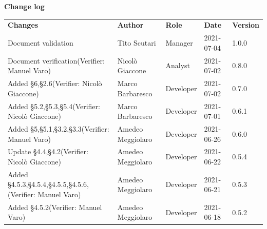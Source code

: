\documentclass[a4paper]{article}
\begin{document}
\begin{center}
    \textbf{\Large Change log}\\
    \vspace{10px}
    \begin{table}[h!]
        \centering
        \renewcommand{\arraystretch}{1.8}
        \begin{tabular}{p{150px} p{90px} p{80px} p{60px} p{45px}}
            \rowcolor{logo!70} \textbf{Changes}                                                    & \textbf{Author}   & \textbf{Role} & \textbf{Date} & \textbf{Version} \\
            Document validation                                                                    & Tito Scutari      & Manager       & 2021-07-04    & 1.0.0            \\
            Document verification\newline(Verifier: Manuel Varo)                                   & Nicolò Giaccone   & Analyst       & 2021-07-02    & 0.8.0            \\
            Added \S{6},\S{2.6}\newline(Verifier: Nicolò Giaccone)                                 & Marco Barbaresco  & Developer     & 2021-07-02    & 0.7.0            \\
            Added \S{5.2},\S{5.3},\S{5.4}\newline(Verifier: Nicolò Giaccone)                       & Marco Barbaresco  & Developer     & 2021-07-01    & 0.6.1            \\
            Added \S{5},\S{5.1},\S{3.2},\S{3.3}\newline(Verifier: Manuel Varo)                     & Amedeo Meggiolaro & Developer     & 2021-06-26    & 0.6.0            \\
            Update \S{4.4},\S{4.2}\newline(Verifier: Nicolò Giaccone)                              & Amedeo Meggiolaro & Developer     & 2021-06-22    & 0.5.4            \\
            Added \S{4.5.3},\S{4.5.4},\S{4.5.5},\S{4.5.6},\newline(Verifier: Manuel Varo)          & Amedeo Meggiolaro & Developer     & 2021-06-21    & 0.5.3            \\
            Added \S{4.5.2}\newline(Verifier: Manuel Varo)                                         & Amedeo Meggiolaro & Developer     & 2021-06-18    & 0.5.2            \\

\end{tabular}
\end{table}
\end{center}
\end{document}
